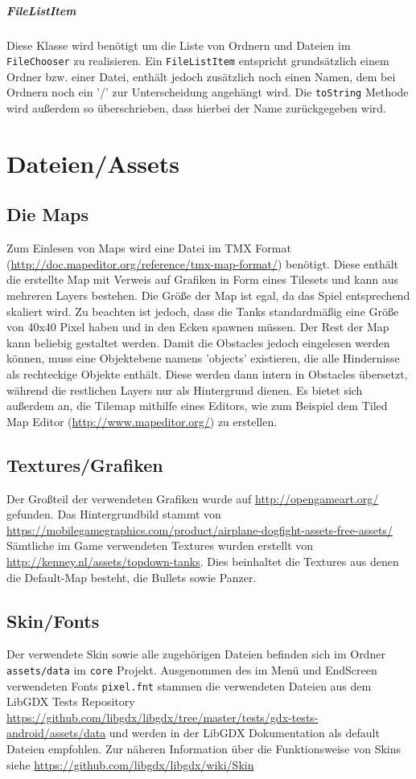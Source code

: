 \documentclass[a4paper]{scrreprt}
\def\code#1{\texttt{#1}}
\begin{document}
\subparagraph{FileListItem}
Diese Klasse wird benötigt um die Liste von Ordnern und Dateien im \code{FileChooser} zu realisieren. Ein \code{FileListItem} entspricht grundsätzlich einem Ordner bzw. einer Datei, enthält jedoch zusätzlich noch einen Namen, dem bei Ordnern noch ein '/' zur Unterscheidung angehängt wird. Die \code{toString} Methode wird außerdem so überschrieben, dass hierbei der Name zurückgegeben wird.

\newpage
\section{Dateien/Assets}
\subsection{Die Maps}
Zum Einlesen von Maps wird eine Datei im TMX Format (\url{http://doc.mapeditor.org/reference/tmx-map-format/}) benötigt. Diese enthält die erstellte Map mit Verweis auf Grafiken in Form eines Tilesets und kann aus mehreren Layers bestehen. Die Größe der Map ist egal, da das Spiel entsprechend skaliert wird. Zu beachten ist jedoch, dass die Tanks standardmäßig eine Größe von 40x40 Pixel haben und in den Ecken spawnen müssen. Der Rest der Map kann beliebig gestaltet werden. Damit die Obstacles jedoch eingelesen werden können, muss eine Objektebene namens 'objects' existieren, die alle Hindernisse als rechteckige Objekte enthält. Diese werden dann intern in Obstacles übersetzt, während die restlichen Layers nur als Hintergrund dienen.
Es bietet sich außerdem an, die Tilemap mithilfe eines Editors, wie zum Beispiel dem Tiled Map Editor (\url{http://www.mapeditor.org/}) zu erstellen.


\subsection{Textures/Grafiken}
Der Großteil der verwendeten Grafiken wurde auf \url{http://opengameart.org/} gefunden.
Das Hintergrundbild stammt von 
\url{https://mobilegamegraphics.com/product/airplane-dogfight-assets-free-assets/}
Sämtliche im Game verwendeten Textures wurden erstellt von \url{http://kenney.nl/assets/topdown-tanks}. Dies beinhaltet die Textures aus denen die Default-Map besteht, die Bullets sowie Panzer.

\subsection{Skin/Fonts}
Der verwendete Skin sowie alle zugehörigen Dateien befinden sich im Ordner \code{assets/data} im \code{core} Projekt. Ausgenommen des im Menü und EndScreen verwendeten Fonts \code{pixel.fnt} stammen die verwendeten Dateien aus dem LibGDX Tests Repository \url{https://github.com/libgdx/libgdx/tree/master/tests/gdx-tests-android/assets/data} und werden in der LibGDX Dokumentation als default Dateien empfohlen. Zur näheren Information über die Funktionsweise von Skins siehe \url{https://github.com/libgdx/libgdx/wiki/Skin}
\end{document}
